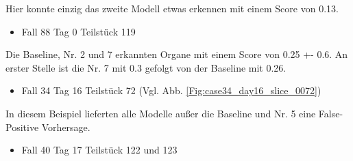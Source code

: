 \begin{table}[H]
\centering
{}
\caption{Siehe Abb. \ref{Fig:case88_day0_slice_0120}}
\end{table}

Hier konnte einzig das zweite Modell etwas erkennen mit einem Score von 0.13. 

\begin{itemize}
\item Fall 88 Tag 0 Teilstück 119
\end{itemize}

\begin{table}[H]
\centering
{}
\caption{Siehe Abb. \ref{Fig:case88_day0_slice_0120}}
\end{table}

Die Baseline, Nr. 2 und 7 erkannten Organe mit einem Score von 0.25 +- 0.6. An erster Stelle ist die Nr. 7 mit 0.3 gefolgt von der Baseline mit 0.26.

\begin{itemize}
\item  Fall 34 Tag 16 Teilstück 72 (Vgl. Abb. \ref{Fig:case34_day16_slice_0072})
\end{itemize}

In diesem Beispiel lieferten alle Modelle außer die Baseline und Nr. 5 eine False-Positive Vorhersage.

\pagebreak

\begin{itemize}
\item Fall 40 Tag 17 Teilstück 122 und 123
\end{itemize}

